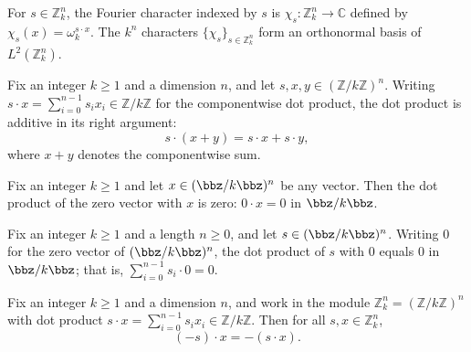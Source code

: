 \begin{definition}
\label{ZkFourier.char_s}
\leanok
{}
For $s \in \mathbb{Z}_k^n$, the Fourier character indexed by $s$ is
$\chi_s : \mathbb{Z}_k^n \to \mathbb{C}$ defined by
$\chi_s(x) = \omega_k^{s \cdot x}$.
The $k^n$ characters $\{\chi_s\}_{s \in \mathbb{Z}_k^n}$ form an orthonormal
basis of $L^2(\mathbb{Z}_k^n)$.
\end{definition}

\begin{lemma}
\label{ZkFourier.zkDot_add_right}
\leanok
{}
Fix an integer $k \ge 1$ and a dimension $n$, and let $s, x, y \in
(\mathbb{Z}/k\mathbb{Z})^n$. Writing $s \cdot x = \sum_{i=0}^{n-1} s_i x_i \in
\mathbb{Z}/k\mathbb{Z}$ for the componentwise dot product, the dot product is additive
in its right argument:
\[
s \cdot (x + y) = s \cdot x + s \cdot y,
\]
where $x + y$ denotes the componentwise sum.
\end{lemma}

\begin{lemma}
\label{ZkFourier.zkDot_zero_left}
\leanok
{}
Fix an integer $k \ge 1$ and let $x \in (\bbz/k\bbz)^n$ be any vector. Then the dot
product of the zero vector with $x$ is zero: $0 \cdot x = 0$ in $\bbz/k\bbz$.
\end{lemma}

\begin{lemma}
\label{ZkFourier.zkDot_zero_right}
\leanok
{}
Fix an integer $k \ge 1$ and a length $n \ge 0$, and let $s \in (\bbz/k\bbz)^n$. Writing
$0$ for the zero vector of $(\bbz/k\bbz)^n$, the dot product of $s$ with $0$ equals $0$
in $\bbz/k\bbz$; that is, $\sum_{i=0}^{n-1} s_i \cdot 0 = 0$.
\end{lemma}

\begin{lemma}
\label{ZkFourier.zkDot_neg_left}
\leanok
{}
Fix an integer $k \ge 1$ and a dimension $n$, and work in the module $\mathbb{Z}_k^n =
(\mathbb{Z}/k\mathbb{Z})^n$ with dot product $s \cdot x = \sum_{i=0}^{n-1} s_i x_i \in
\mathbb{Z}/k\mathbb{Z}$. Then for all $s, x \in \mathbb{Z}_k^n$,
\[
(-s) \cdot x = -(s \cdot x).
\]
\end{lemma}

